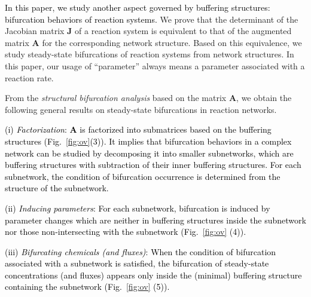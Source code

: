 \documentclass[ amsmath,amssymb,nofootinbib
]{revtex4-1}
\newcommand{\red}[1]{\textcolor{black}{#1}}
\newcommand{\corr}[1]{\textcolor{black}{#1}}
\begin{document}
\corr{In this paper, we study another aspect  governed by buffering structures: bifurcation behaviors \red{of}  reaction systems.}
We prove that  the determinant of the Jacobian matrix {\bf J} of  a reaction system is equivalent to that of the augmented matrix {\bf A}  for the corresponding network structure. 
Based on this equivalence, we study steady-state bifurcations of  reaction systems from network structures. In this paper, our usage of  ``parameter'' always means a parameter associated with a reaction rate. 

From the {\it  structural bifurcation analysis} based on the matrix {\bf A}, we  obtain the following general results on steady-state bifurcations in reaction networks. 

\corr{
(i) {\it Factorization}:  {\bf A} is factorized into submatrices based on the buffering structures (Fig.~\ref{fig:ov}(3)).
It implies that { bifurcation behaviors in} a complex network can be studied  by decomposing it into smaller subnetworks, which are buffering structures with subtraction of their inner buffering structures. 
For each subnetwork, the condition of bifurcation occurrence is determined from \red{the} structure of {the subnetwork}. 
}

\corr{
(ii) {\it Inducing parameters}: 
For each subnetwork, bifurcation is induced by parameter changes which are neither in buffering structures inside the subnetwork nor those non-intersecting with the subnetwork (Fig.~\ref{fig:ov} (4)).
}

\corr{
(iii) {\it Bifurcating chemicals {(and fluxes)}}:  
When the condition of bifurcation associated with a subnetwork is satisfied, the bifurcation of steady-state concentrations {(and fluxes)} \red{appears} only inside the (minimal) buffering structure containing the subnetwork (Fig.~\ref{fig:ov} (5)).
}
\end{document}
